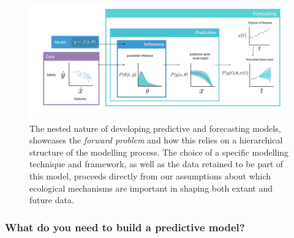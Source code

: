 \begin{figure}[h]
    \centering
    \includegraphics[width=\textwidth]{figures/forecasting_v4.png}
    \caption{The nested nature of developing predictive and forecasting
models, showcases the \emph{forward problem} and how this relies on a
hierarchical structure of the modelling process. The choice of a
specific modelling technique and framework, as well as the data retained
to be part of this model, proceeds directly from our assumptions about
which ecological mechanisms are important in shaping both extant and
future data.}
    \label{fig:models}
\end{figure}

\subsubsection{What do you need to build a predictive
model?}\label{what-do-you-need-to-build-a-predictive-model}

